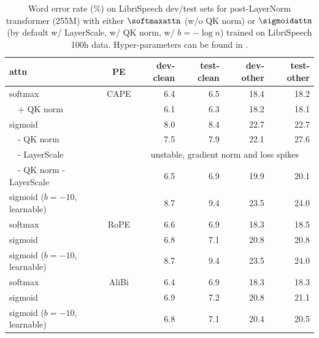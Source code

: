 \begin{table}[t!]
\centering
\caption{Word error rate (\%) on LibriSpeech dev/test sets for post-LayerNorm transformer (255M) with either $\softmaxattn$ (w/o QK norm) or $\sigmoidattn$ (by default w/ LayerScale, w/ QK norm, w/ $b=-\log n$) trained on LibriSpeech 100h data. Hyper-parameters can be found in .}
\label{tab:asr-post-100h}
\begin{center}
\begin{scriptsize}
\begin{sc}
\begin{tabular}{lc|rrrr}
\toprule
 attn & PE & dev-clean & test-clean & dev-other & test-other \\
\midrule 
softmax & CAPE & 6.4 & 6.5 & 18.4 & 18.2 \\
\,\,\,\, + QK norm & & 6.1 & 6.3 & 18.2 & 18.1  \\
sigmoid & & 8.0 & 8.4 & 22.7 &  22.7\\
\,\,\,\, - QK norm & & 7.5 & 7.9 & 22.1 & 27.6 \\
\,\,\,\, - LayerScale & & \multicolumn{4}{c}{unstable, gradient norm and loss spikes} \\
\,\,\,\, - QK norm - LayerScale & & 6.5 & 6.9 & 19.9 & 20.1 \\ 
sigmoid ($b=-10$, learnable)  & & 8.7 & 9.4 & 23.5 & 24.0 \\
\midrule
softmax & RoPE & 6.6 & 6.9 & 18.3 & 18.5 \\
sigmoid & & 6.8 & 7.1 & 20.8 & 20.8\\
sigmoid ($b=-10$, learnable)  & & 8.7 & 9.4 & 23.5 & 24.0 \\
\midrule
softmax & AliBi & 6.4 & 6.9 & 18.3 & 18.3 \\
sigmoid & & 6.9 & 7.2 & 20.8 & 21.1 \\
sigmoid ($b=-10$, learnable)  & & 6.8 & 7.1 & 20.4 & 20.5\\
\bottomrule
\end{tabular}
\end{sc}
\end{scriptsize}
\end{center}
\end{table}


